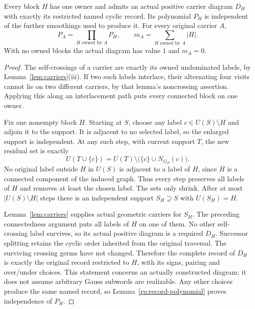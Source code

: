 \begin{lemma}
\label{cb:products}\leanok
Every block $H$ has one owner and admits an actual positive carrier
diagram $D_H$ with exactly its restricted named cyclic record. Its
polynomial $P_H$ is independent of the further smoothings used to
produce it. For every original carrier $A$,
\begin{equation}\label{cb:product}
 P_A=\prod_{H\text{ owned by }A}P_H,
 \qquad m_A=\sum_{H\text{ owned by }A}|H|.
\end{equation}
With no owned blocks the actual diagram has value $1$ and $m_A=0$.

\end{lemma}
\begin{proof}\leanok{}
The self-crossings of a carrier are exactly its owned undominated
labels, by Lemma~\ref{lem:carriers}(iii). If two such labels interlace,
their alternating four visits cannot lie on two different carriers,
by that lemma's noncrossing assertion. Applying this along an
interlacement path puts every connected block on one owner.

Fix one nonempty block $H$. Starting at $S$, choose any label
$c\in U(S)\setminus H$ and adjoin it to the support. It is adjacent
to no selected label, so the enlarged support is independent. At any
such step, with current support $T$, the new residual set is exactly
\begin{equation}\label{cb:greedy-step}
 U(T\cup\{c\})=U(T)\setminus\bigl(\{c\}\cup N_{G_P}(c)\bigr).
\end{equation}
No original label outside $H$ in $U(S)$ is adjacent to a label of $H$,
since $H$ is a connected component of the induced graph. Thus every
step preserves all labels of $H$ and removes at least the chosen label.
The sets only shrink. After at most $|U(S)\setminus H|$ steps there is
an independent support $S_H\supseteq S$ with $U(S_H)=H$.

Lemma~\ref{lem:carriers} supplies actual geometric carriers for $S_H$.
The preceding connectedness argument puts all labels of $H$ on one
of them. No other self-crossing label survives, so its actual positive
diagram is a required $D_H$. Successor splitting retains the cyclic
order inherited from the original traversal. The surviving crossing
germs have not changed. Therefore the complete record of $D_H$ is
exactly the original record restricted to $H$, with its signs, pairing
and over/under choices. This statement concerns an actually constructed
diagram; it does not assume arbitrary Gauss subwords are realizable.
Any other choices produce the same named record, so
Lemma~\ref{rp:record-polynomial} proves independence of $P_H$.


\end{proof}
